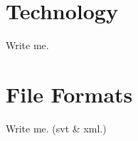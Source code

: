 \documentclass[10pt,a4paper,twoside]{article}
\begin{document}
\section{Technology}
Write me.



\section{File Formats}
Write me. (svt \& xml.)
\end{document}

